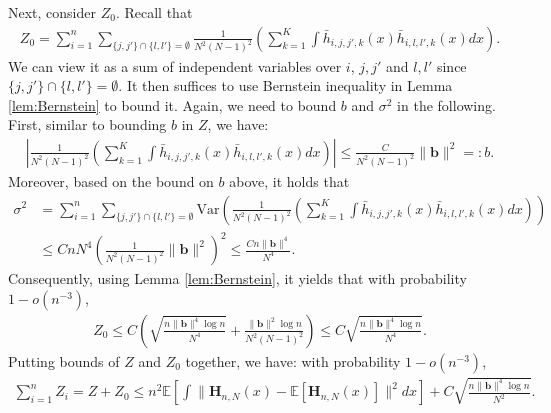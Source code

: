 \documentclass[preprint,11pt]{article}
\newcommand{\mbb}{\mathbb}
\newcommand{\Var}{\text{Var}}
\numberwithin{equation}{section}
\begin{document}
Next, consider $Z_0$. Recall that
\begin{align*}
    Z_0=\sum_{i=1}^n\sum_{\{j,j'\}\cap\{l,l'\}=\emptyset}\frac{1}{N^2(N-1)^2}\left(\sum_{k=1}^K\int \bar{h}_{i,j,j',k}(x)\bar{h}_{i,l,l',k}(x)dx\right).
\end{align*}
We can view it as a sum of independent variables over $i$, $j,j'$ and $l,l'$ since $\{j,j'\}\cap\{l,l'\}=\emptyset$. It then suffices to use Bernstein inequality in Lemma \ref{lem:Bernstein} to bound it. Again, we need to bound $b$ and $\sigma^2$ in the following. First, similar to bounding $b$ in $Z$, we have:
\begin{align*}
    \left|\frac{1}{N^2(N-1)^2}\left(\sum_{k=1}^K\int \bar{h}_{i,j,j',k}(x)\bar{h}_{i,l,l',k}(x)dx\right)\right|\le \frac{C}{N^2(N-1)^2}\|\bm{b}\|^2=:b.
\end{align*}
Moreover, based on the bound on $b$ above, it holds that
\begin{align*}
    \sigma^2&=\sum_{i=1}^n\sum_{\{j,j'\}\cap\{l,l'\}=\emptyset}\Var\left(\frac{1}{N^2(N-1)^2}\left(\sum_{k=1}^K\int \bar{h}_{i,j,j',k}(x)\bar{h}_{i,l,l',k}(x)dx\right)\right)\\
    &\le CnN^4\left(\frac{1}{N^2(N-1)^2}\|\bm{b}\|^2\right)^2\le \frac{Cn\|\bm{b}\|^4}{N^4}.
\end{align*}
Consequently, using Lemma \ref{lem:Bernstein}, it yields that with probability $1-o(n^{-3})$,
\begin{align*}
    Z_0\le C\left(\sqrt{\frac{n\|\bm{b}\|^4\log n}{N^4}}+\frac{\|\bm{b}\|^2\log n}{N^2(N-1)^2}\right)\le C\sqrt{\frac{n\|\bm{b}\|^4\log n}{N^4}}.
\end{align*}
Putting bounds of $Z$ and $Z_0$ together, we have: with probability $1-o(n^{-3})$,
\begin{align*}
    \sum_{i=1}^n Z_i=Z+Z_0\le n^2\mbb{E}\left[\int \|\bm{H}_{n,N}(x)-\mbb{E}[\bm{H}_{n,N}(x)]\|^2dx\right]+C\sqrt{\frac{n\|\bm{b}\|^4\log n}{N^2}}.
\end{align*}
\end{document}
